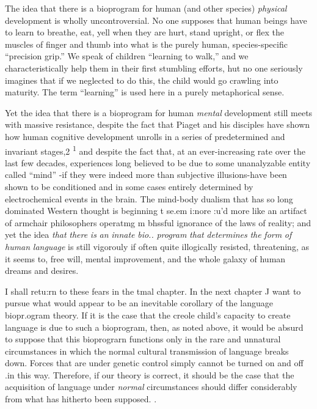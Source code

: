 The idea that there is a bioprogram for human (and other spe\-cies) \textit{physical} development is wholly uncontroversial. No one supposes that human beings have to learn to breathe, eat, yell when they are hurt, stand upright, or flex the muscles of finger and thumb into what is the purely human, species-specific ``precision grip.'' We speak of children ``learning to walk,'' and we characteristically help them in their first stumbling efforts, hut no one seriously imagines that if we neglected to do this, the child would go crawling into maturity. The term ``learning'' is used here in a purely metaphorical sense.

Yet the idea that there is a bioprogram for human \textit{mental} de\-velopment still meets with massive resistance, despite the fact that Piaget and his disciples have shown how human cognitive development unrolls in a series of predetermined and invariant stages,2 \textsuperscript{1} and despite
the fact that, at an ever-increasing rate over the last few decades, experi\-ences long believed to be due to some unanalyzable entity called ``mind'' {}-if they were indeed more than subjective illusions{}-have been shown to be conditioned and in some cases entirely determined by electrochemical events in the brain. The mind-body dualism that has so long dominated Western thought is beginning t se.em i:nore :u'd more like an artifact of armchair philosophers operatmg m bhssful ignorance of the laws of reality; and yet the idea \textit{that} \textit{there} \textit{is} \textit{an} \textit{innate} \textit{bio}\textit{..} \textit{program} \textit{that} \textit{determines} \textit{the} \textit{form} \textit{of} \textit{human} \textit{language} is still vigorouly if often quite illogically resisted, threatening, as it seems to, free will, mental improvement, and the whole galaxy of human dreams and
desires.

I shall retu:rn to these fears in the tmal chapter. In the next chapter J want to pursue what would appear to be an inevitable corol\-lary of the language biopr.ogram theory. If it is the case that the creole child's capacity to create language is due to such a bioprogram, then, as noted above, it would be absurd to suppose that this bioprograrn functions only in the rare and unnatural circumstances in which the normal cultural transmission of language breaks down. Forces that are under genetic control simply cannot be turned on and off .in this way. Therefore, if our theory is correct, it should be the case that the acquisition of language under \textit{normal} circumstances should differ considerably from what has hitherto been supposed. .

